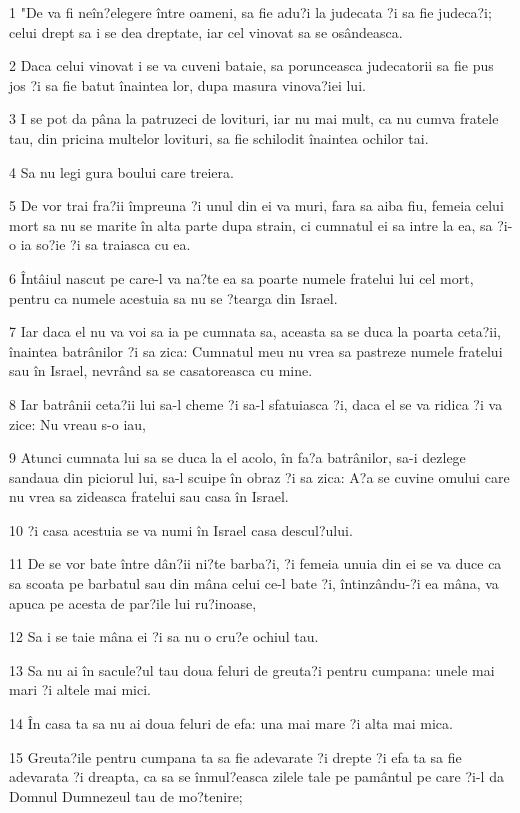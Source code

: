 \par 1 "De va fi neîn?elegere între oameni, sa fie adu?i la judecata ?i sa fie judeca?i; celui drept sa i se dea dreptate, iar cel vinovat sa se osândeasca.
\par 2 Daca celui vinovat i se va cuveni bataie, sa porunceasca judecatorii sa fie pus jos ?i sa fie batut înaintea lor, dupa masura vinova?iei lui.
\par 3 I se pot da pâna la patruzeci de lovituri, iar nu mai mult, ca nu cumva fratele tau, din pricina multelor lovituri, sa fie schilodit înaintea ochilor tai.
\par 4 Sa nu legi gura boului care treiera.
\par 5 De vor trai fra?ii împreuna ?i unul din ei va muri, fara sa aiba fiu, femeia celui mort sa nu se marite în alta parte dupa strain, ci cumnatul ei sa intre la ea, sa ?i-o ia so?ie ?i sa traiasca cu ea.
\par 6 Întâiul nascut pe care-l va na?te ea sa poarte numele fratelui lui cel mort, pentru ca numele acestuia sa nu se ?tearga din Israel.
\par 7 Iar daca el nu va voi sa ia pe cumnata sa, aceasta sa se duca la poarta ceta?ii, înaintea batrânilor ?i sa zica: Cumnatul meu nu vrea sa pastreze numele fratelui sau în Israel, nevrând sa se casatoreasca cu mine.
\par 8 Iar batrânii ceta?ii lui sa-l cheme ?i sa-l sfatuiasca ?i, daca el se va ridica ?i va zice: Nu vreau s-o iau,
\par 9 Atunci cumnata lui sa se duca la el acolo, în fa?a batrânilor, sa-i dezlege sandaua din piciorul lui, sa-l scuipe în obraz ?i sa zica: A?a se cuvine omului care nu vrea sa zideasca fratelui sau casa în Israel.
\par 10 ?i casa acestuia se va numi în Israel casa descul?ului.
\par 11 De se vor bate între dân?ii ni?te barba?i, ?i femeia unuia din ei se va duce ca sa scoata pe barbatul sau din mâna celui ce-l bate ?i, întinzându-?i ea mâna, va apuca pe acesta de par?ile lui ru?inoase,
\par 12 Sa i se taie mâna ei ?i sa nu o cru?e ochiul tau.
\par 13 Sa nu ai în sacule?ul tau doua feluri de greuta?i pentru cumpana: unele mai mari ?i altele mai mici.
\par 14 În casa ta sa nu ai doua feluri de efa: una mai mare ?i alta mai mica.
\par 15 Greuta?ile pentru cumpana ta sa fie adevarate ?i drepte ?i efa ta sa fie adevarata ?i dreapta, ca sa se înmul?easca zilele tale pe pamântul pe care ?i-l da Domnul Dumnezeul tau de mo?tenire;
